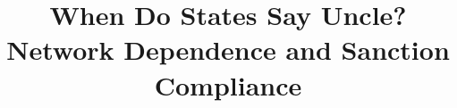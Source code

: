 \documentclass[12pt,onesided]{amsart}
\title[Network Dependence and Sanction Compliance]{When Do States Say Uncle? Network Dependence and Sanction Compliance}
\begin{document}
\maketitle\thispagestyle{empty}

\begin{abstract}

\singlespacing{}

\end{abstract}

\newpage\setcounter{page}{1} 













\newpage


\end{document}
